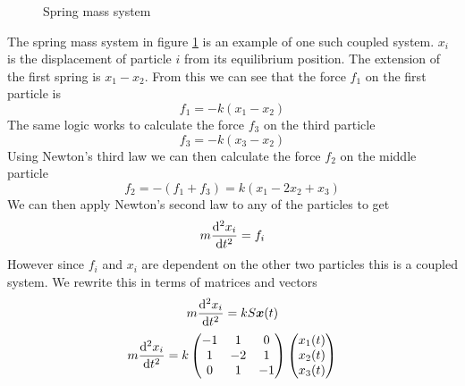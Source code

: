 \documentclass{article}
\begin{document}
    \begin{figure}[ht]
        \centering
        \usetikzlibrary{snakes}
        \caption{Spring mass system}
        \label{fig:spring mass system}
    \end{figure}
    The spring mass system in figure \ref{fig:spring mass system} is an example of one such coupled system.
    \(x_i\) is the displacement of particle \(i\) from its equilibrium position.
    The extension of the first spring is \(x_1 - x_2\).
    From this we can see that the force \(f_1\) on the first particle is
    \[f_1 = -k(x_1 - x_2)\]
    The same logic works to calculate the force \(f_3\) on the third particle
    \[f_3 = -k(x_3 - x_2)\]
    Using Newton's third law we can then calculate the force \(f_2\) on the middle particle
    \[f_2 = -(f_1 + f_3) = k(x_1 - 2x_2 + x_3)\]
    We can then apply Newton's second law to any of the particles to get
    \[m\dv[2]{x_i}{t} = f_i\]
    However since \(f_i\) and \(x_i\) are dependent on the other two particles this is a coupled system.
    We rewrite this in terms of matrices and vectors
    \[m\dv[2]{x_i}{t} = kS\bm{x}(t)\]
    \[
        m\dv[2]{x_i}{t} = k
        \begin{pmatrix}
            -1 & 1 & 0\\
            1 & -2 & 1\\
            0 & 1 & -1
        \end{pmatrix}
        \begin{pmatrix}
            x_1(t) \\ x_2(t) \\ x_3(t)
        \end{pmatrix}
    \]
    
\end{document}
